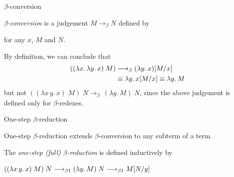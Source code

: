 \begin{frame}{$\beta$-conversion}
\begin{definition}
  $\beta$-\emph{conversion} is a judgement $M \longrightarrow_\beta N$ defined by
  \begin{prooftree}
  \end{prooftree}
  for any $x$, $M$ and $N$.
\end{definition}

By definition, we can conclude that 
  \begin{align*}
    ((\lambda x.\,\lambda y.\,x)\;M)
    & \longrightarrow_{\beta}
    (\lambda y.\, x)\subst{M}{x} \\
    & \equiv \lambda y.\, x\subst{M}{x} \equiv \lambda y.\, M \\
  \end{align*}
  but not $((\lambda x\, y.\, x)\; M)\;N \longrightarrow_{\beta} \, (\lambda
  y.\, M)\;N$,
  since the above judgement is defined only for $\beta$-redexes.
\end{frame}

\begin{frame}{One-step $\beta$-reduction}

One-step $\beta$-reduction extends $\beta$-conversion to any subterm of a
term.  

\begin{definition}
  The \emph{one-step (full) $\beta$-reduction} is defined inductively by
  \begin{multicols}{2}
    \begin{prooftree}
    \end{prooftree}
    \begin{prooftree}
    \end{prooftree}
    \begin{prooftree}
    \end{prooftree}
    \begin{prooftree}
    \end{prooftree}
  \end{multicols}
\end{definition}
    $((\lambda x\, y.\, x)\; M)\;N \onereduce (\lambda y.\, M)\;N \onereduce M\subst{N}{y}$
\end{frame}

